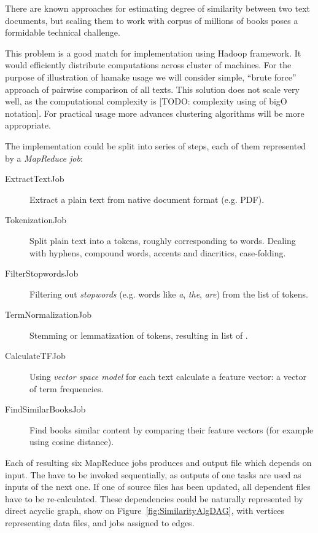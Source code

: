 \documentclass[10pt,conference,letterpaper]{IEEEtran}
\begin{document}
There are known approaches for estimating degree of similarity between
two text documents, but scaling them to work with corpus of millions
of books poses a formidable technical challenge.

This problem is a good match for implementation using Hadoop
framework. It would efficiently distribute computations across cluster
of machines. For the purpose of illustration of hamake usage we will
consider simple, ``brute force'' approach of pairwise comparison of
all texts. This solution does not scale very well, as the
computational complexity is [TODO: complexity using of bigO
notation]. For practical usage more advances clustering algorithms
will be more appropriate.

The implementation could be split into series of steps, each of them
represented by a \textit{MapReduce job}:

\begin{description}
\item[ExtractTextJob] Extract a plain text from native document format
  (e.g. PDF).
\item[TokenizationJob] Split plain text into a tokens, roughly
  corresponding to words. Dealing with hyphens, compound words,
  accents and diacritics, case-folding.
\item[FilterStopwordsJob] Filtering out \textit{stopwords} (e.g. words
  like \textit{a}, \textit{the}, \textit{are}) from the list of
  tokens.
\item[TermNormalizationJob] Stemming or lemmatization of tokens,
  resulting in list of .
\item[CalculateTFJob] Using \textit{vector space
    model}\cite{manning2008introduction} for each text calculate a
  feature vector: a vector of term frequencies.
\item[FindSimilarBooksJob] Find books similar content by comparing
  their feature vectors (for example using cosine
  distance\cite{wiki:cosinesimilarity}).
\end{description}

Each of resulting six MapReduce jobs produces and output file which
depends on input. The have to be invoked sequentially, as outputs of
one tasks are used as inputs of the next one. If one of source files
has been updated, all dependent files have to be re-calculated. These
dependencies could be naturally represented by direct acyclic graph,
show on Figure~\ref{fig:SimilarityAlgDAG}, with vertices representing
data files, and jobs assigned to edges.
\end{document}
